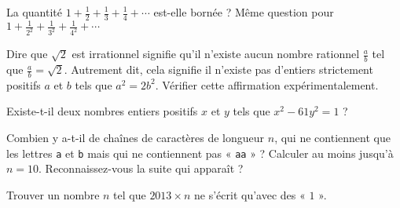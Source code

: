 % 
% 


\begin{question}
La quantité
$1 + \frac{1}{2} + \frac{1}{3} + \frac{1}{4} + \cdots$
est-elle bornée ?
Même question pour
$1 + \frac{1}{2^2} + \frac{1}{3^2} + \frac{1}{4^2} + \cdots$
\end{question}


\begin{question}
Dire que $\sqrt{2}$ est irrationnel signifie qu'il n'existe aucun nombre rationnel $\frac{a}{b}$ tel que $\frac{a}{b} = \sqrt{2}$.
Autrement dit, cela signifie il n'existe pas d'entiers strictement positifs $a$ et $b$ tels que $a^2 = 2b^2$.
Vérifier cette affirmation expérimentalement.
\end{question}


\begin{question}
Existe-t-il deux nombres entiers positifs $x$ et $y$ tels que $x^2 - 61y^2 = 1$ ?
\end{question}


\begin{question}
Combien y a-t-il de chaînes de caractères de longueur $n$,
qui ne contiennent que les lettres \texttt{a} et \texttt{b}
mais qui ne contiennent pas « \texttt{aa} » ?
Calculer au moins jusqu'à $n = 10$.
Reconnaissez-vous la suite qui apparaît ?
\end{question}


\begin{question}
Trouver un nombre $n$ tel que $2013 \times n$ ne s'écrit qu'avec des « $1$ ».
\end{question}

